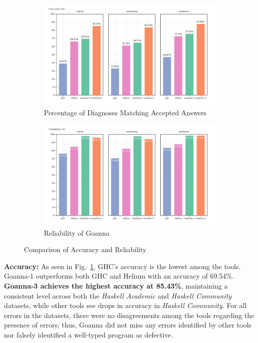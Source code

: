 \documentclass[pdflatex,lineno,sn-nature,Numbered]{sn-jnl}%
\begin{document}
\begin{figure}[ht!]
    \centering
    \begin{subfigure}{0.49\linewidth}
        \centering
        \includegraphics[width=\linewidth]{images/accuracy.png}
        \caption{Percentage of Diagnoses Matching Accepted Answers} 
        \label{fig:accuracy}
    \end{subfigure}
    \hfill
    \begin{subfigure}{0.49\linewidth}
        \centering
        \includegraphics[width=\linewidth]{images/Reliability.png}
        \caption{Reliability of Goanna} 
        \label{fig:reliability}
    \end{subfigure}
    \caption{Comparison of Accuracy and Reliability}
\end{figure}

\textbf{Accuracy:} As seen in Fig.~\ref{fig:accuracy}, GHC's accuracy is the lowest among the tools. Goanna-1 outperforms both GHC and Helium with an accuracy of 69.54\%. \textbf{Goanna-3 achieves the highest accuracy at 85.43\%}, maintaining a consistent level across both the \textit{Haskell Academic} and \textit{Haskell Community} datasets, while other tools see drops in accuracy in \textit{Haskell Community}. For all errors in the datasets, there were no disagreements among the tools regarding the presence of errors; thus, Goanna did not miss any errors identified by other tools nor falsely identified a well-typed program as defective.
\end{document}
